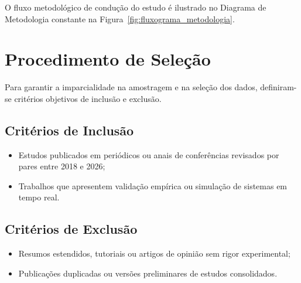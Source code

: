 O fluxo metodológico de condução do estudo é ilustrado no Diagrama de Metodologia constante na Figura~\ref{fig:fluxograma_metodologia}.



\section{Procedimento de Seleção}
\label{sub:selecao_pesquisa}

Para garantir a imparcialidade na amostragem e na seleção dos dados, definiram-se critérios objetivos de inclusão e exclusão.

\subsection{Critérios de Inclusão}
\label{sub:criterios_inclusao}

\begin{itemize}
    \item Estudos publicados em periódicos ou anais de conferências revisados por pares entre 2018 e 2026;
    \item Trabalhos que apresentem validação empírica ou simulação de sistemas em tempo real.
\end{itemize}

\subsection{Critérios de Exclusão}
\label{sub:criterios_exclusao}

\begin{itemize}
    \item Resumos estendidos, tutoriais ou artigos de opinião sem rigor experimental;
    \item Publicações duplicadas ou versões preliminares de estudos consolidados.
\end{itemize}
